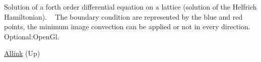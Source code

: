 Solution of a forth order differential equation on a lattice (solution of the Helfrich Hamiltonian). ~\newline
 The boundary condition are represented by the blue and red points, the minimum image convection can be applied or not in every direction.~\newline
 Optional\+:Open\+Gl. 
\begin{DoxyItemize}
\item \hyperlink{index}{Allink} (Up)  
\end{DoxyItemize}